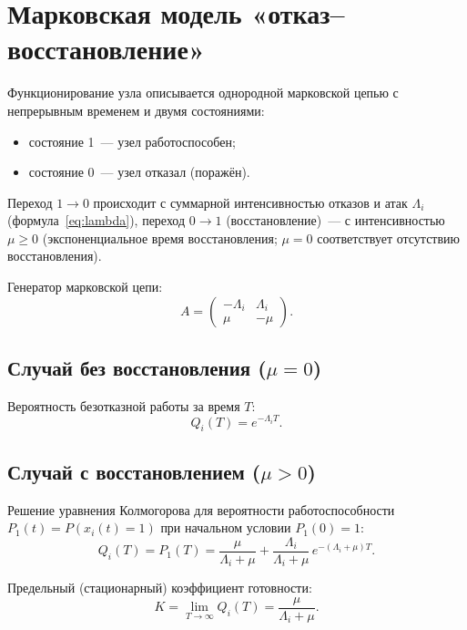 \documentclass[12pt]{article}
\begin{document}
\section{Марковская модель «отказ--восстановление»}

Функционирование узла описывается однородной марковской цепью с
непрерывным временем и двумя состояниями:
\begin{itemize}
  \item состояние 1~--- узел работоспособен;
  \item состояние 0~--- узел отказал (поражён).
\end{itemize}

Переход $1 \to 0$ происходит с суммарной интенсивностью отказов и атак
$\Lambda_i$ (формула~\eqref{eq:lambda}), переход $0 \to 1$ (восстановление)~---
с интенсивностью $\mu \geq 0$ (экспоненциальное время восстановления;
$\mu = 0$ соответствует отсутствию восстановления).

Генератор марковской цепи:
\begin{equation}
A = \begin{pmatrix}
-\Lambda_i & \Lambda_i \\
\mu & -\mu
\end{pmatrix}.
\end{equation}

\subsection{Случай без восстановления ($\mu = 0$)}

Вероятность безотказной работы за время $T$:
\begin{equation}
Q_i(T) = e^{-\Lambda_i T}.
\label{eq:cold}
\end{equation}

\subsection{Случай с восстановлением ($\mu > 0$)}

Решение уравнения Колмогорова для вероятности работоспособности
$P_1(t) = P(x_i(t) = 1)$ при начальном условии $P_1(0) = 1$:
\begin{equation}
Q_i(T) = P_1(T) = \frac{\mu}{\Lambda_i + \mu}
+ \frac{\Lambda_i}{\Lambda_i + \mu}\, e^{-(\Lambda_i + \mu) T}.
\label{eq:main}
\end{equation}

Предельный (стационарный) коэффициент готовности:
\begin{equation}
K = \lim_{T \to \infty} Q_i(T) = \frac{\mu}{\Lambda_i + \mu}.
\label{eq:steady}
\end{equation}
\end{document}
